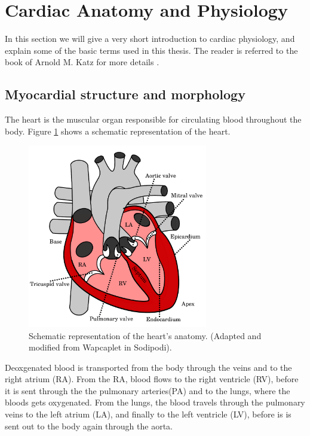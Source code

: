 \section{Cardiac Anatomy and Physiology}
\label{sec:intro_physiology}
In this section we will give a very short introduction to cardiac
physiology, and explain some of the basic terms used in this
thesis. The reader is referred to the book of Arnold M. Katz for 
more details \cite{katz2010physiology}.


\subsection{Myocardial structure and morphology}
The heart is the muscular organ responsible for circulating blood
throughout the body. Figure \ref{fig:heart_anatomy} shows a schematic
representation of the heart. 


\begin{figure}[htbp]
  \centering
    \includegraphics[width=0.7\textwidth]{chapters/introduction/figures/heart_anatomy.pdf}
\caption{Schematic representation of the heart's anatomy. (Adapted and modified from Wapcaplet in Sodipodi).}
\label{fig:heart_anatomy}
\end{figure}


Deoxgenated blood is transported from the body through the veins and to
the right atrium (RA). From the RA, blood flows to the right ventricle
(RV), before it is sent through the the pulmonary arteries(PA) and to the
lungs, where the bloods gets oxygenated. From the lungs, the blood
travels through the pulmonary veins to the left atrium (LA), and
finally to the left ventricle (LV), before is is sent out to the body
again through the aorta.

